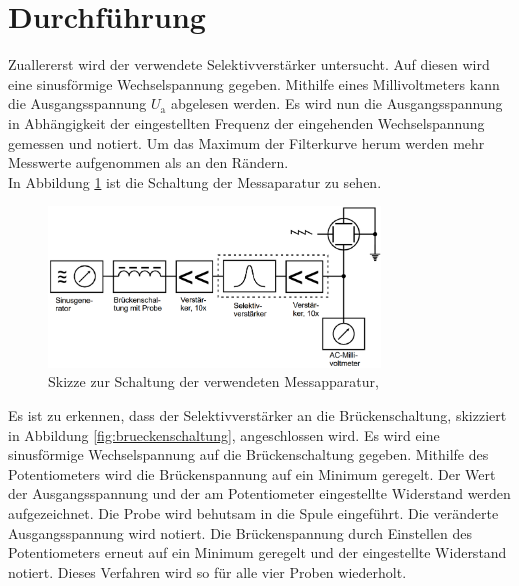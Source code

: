 \section{Durchführung}
\label{sec:Durchführung}

Zuallererst wird der verwendete Selektivverstärker untersucht. Auf diesen wird
eine sinusförmige Wechselspannung gegeben. Mithilfe eines Millivoltmeters kann
die Ausgangsspannung $U_\text{a}$ abgelesen werden. Es wird nun die Ausgangsspannung
in Abhängigkeit der eingestellten Frequenz der eingehenden Wechselspannung gemessen
und notiert. Um das Maximum der Filterkurve herum werden mehr Messwerte aufgenommen als
an den Rändern.\\
In Abbildung \ref{fig:schaltung} ist die Schaltung der Messaparatur zu sehen.

\begin{figure}[H]
  \centering
  \includegraphics[width=250pt]{data/schaltung.png}
  \caption{Skizze zur Schaltung der verwendeten Messapparatur,\cite{Versuchsanleitung}}
  \label{fig:schaltung}
\end{figure}

Es ist zu erkennen, dass der Selektivverstärker an die Brückenschaltung, skizziert in
Abbildung \ref{fig:brueckenschaltung}, angeschlossen wird. Es wird eine sinusförmige
Wechselspannung auf die Brückenschaltung gegeben. Mithilfe des Potentiometers wird die
Brückenspannung auf ein Minimum geregelt. Der Wert der Ausgangsspannung und der am Potentiometer
eingestellte Widerstand werden aufgezeichnet. Die Probe wird behutsam in die Spule eingeführt.
Die veränderte Ausgangsspannung wird notiert. Die Brückenspannung durch Einstellen
des Potentiometers erneut auf ein Minimum geregelt und der eingestellte Widerstand notiert.
Dieses Verfahren wird so für alle vier Proben wiederholt.
